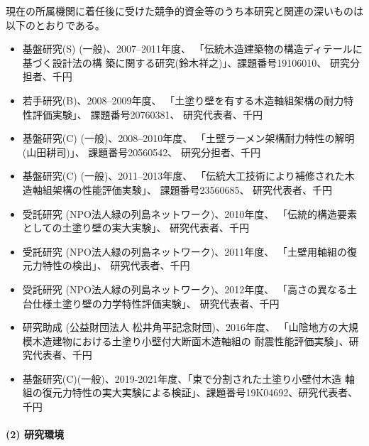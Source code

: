 \documentclass[11pt,a4paper,uplatex,dvipdfmx]{ujarticle} 		%
\newcommand{\研究課題名}{伝統的な木造土塗り壁の復元力に及ぼす軸組の影響に関する実験研究}
\newcommand{\研究機関名}{公立鳥取環境大学}
\newcommand{\研究代表者氏名}{中治弘行}
\newcommand{\私}{{\研究代表者氏名}}
\newcommand{\研究期間の最終元号年度}{8}  %
\begin{document}
現在の所属機関に着任後に受けた競争的資金等のうち本研究と関連の深いものは
以下のとおりである。

\begin{itemize}
  \small
  \itemsep=-2pt
\item 基盤研究(S) (一般)、2007--2011年度、
  「伝統木造建築物の構造ディテールに基づく設計法の構
  築に関する研究(鈴木祥之)」、課題番号19106010、
  研究分担者、千円

\item 若手研究(B)、2008--2009年度、
  「土塗り壁を有する木造軸組架構の耐力特性評価実験」、
  課題番号20760381、
  研究代表者、千円

\item 基盤研究(C) (一般)、2008--2010年度、
  「土壁ラーメン架構耐力特性の解明(山田耕司)」、
  課題番号20560542、
  研究分担者、千円

\item 基盤研究(C) (一般)、2011--2013年度、
  「伝統大工技術により補修された木造軸組架構の性能評価実験」、
  課題番号23560685、
  研究代表者、千円

\item 受託研究 (NPO法人緑の列島ネットワーク)、2010年度、
  「伝統的構造要素としての土塗り壁の実大実験」、
  研究代表者、千円

\item 受託研究 (NPO法人緑の列島ネットワーク)、2011年度、
  「土壁用軸組の復元力特性の検出」、
  研究代表者、千円

\item 受託研究 (NPO法人緑の列島ネットワーク)、2012年度、
  「高さの異なる土台仕様土塗り壁の力学特性評価実験」、
  研究代表者、千円

\item 研究助成 (公益財団法人 松井角平記念財団)、2016年度、
  「山陰地方の大規模木造建物における土塗り小壁付大断面木造軸組の
  耐震性能評価実験」、研究代表者、千円
  
  \item 基盤研究(C)(一般)、2019-2021年度、「束で分割された土塗り小壁付木造
    軸組の復元力特性の実大実験による検証」、課題番号19K04692、研究代表者、
    千円
    
\end{itemize}


\paragraph{(2) 研究環境}
\mbox{}\par
\end{document}
